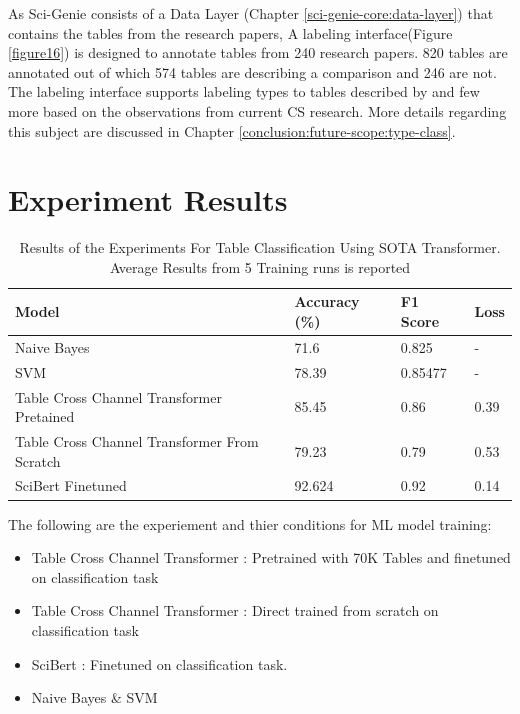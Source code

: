 As Sci-Genie consists of a Data Layer (Chapter \ref{sci-genie-core:data-layer}) that contains the tables from the research papers, A labeling interface(Figure \ref{figure16}) is designed to annotate tables from 240 research papers. 820 tables are annotated out of which 574 tables are describing a comparison and 246 are not. The labeling interface supports labeling types to tables described by \cite{kim2012scientific} and few more based on the observations from current CS research. More details regarding this subject are discussed in Chapter \ref{conclusion:future-scope:type-class}. 

\section{Experiment Results}
\label{table_classification:experiement-result}
\begin{table}[h]
    \label{table\arabic{tablecounter}}
    \centering
    \begin{tabular}{|l|l|l|l|}
    \hline
        \textbf{Model} & \textbf{Accuracy} (\%) & \textbf{F1 Score}  & \textbf{Loss} \\ \hline
        Naive Bayes & 71.6 & 0.825 & - \\ \hline
        SVM  & 78.39 & 0.85477 & - \\ \hline
        Table Cross Channel Transformer Pretained & 85.45 & 0.86 & 0.39 \\ \hline
        Table Cross Channel Transformer From Scratch & 79.23 & 0.79 & 0.53 \\ \hline
        SciBert Finetuned & 92.624 & 0.92 & 0.14 \\ \hline
    \end{tabular}
    \caption{\label{tablecounter} Results of the Experiments For Table Classification Using SOTA Transformer. Average Results from 5 Training runs is reported}
\end{table}
The following are the experiement and thier conditions for ML model training:
\begin{itemize}
    \item Table Cross Channel Transformer : Pretrained with 70K Tables and finetuned on classification task
    \item Table Cross Channel Transformer : Direct trained from scratch on classification task 
    \item SciBert : Finetuned on classification task.
    \item Naive Bayes \& SVM
\end{itemize}
